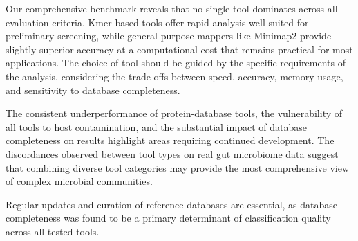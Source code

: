 \documentclass[11pt]{article}
\begin{document}
Our comprehensive benchmark reveals that no single tool dominates across all evaluation criteria. Kmer-based tools offer rapid analysis well-suited for preliminary screening, while general-purpose mappers like Minimap2 provide slightly superior accuracy at a computational cost that remains practical for most applications. The choice of tool should be guided by the specific requirements of the analysis, considering the trade-offs between speed, accuracy, memory usage, and sensitivity to database completeness.

The consistent underperformance of protein-database tools, the vulnerability of all tools to host contamination, and the substantial impact of database completeness on results highlight areas requiring continued development. The discordances observed between tool types on real gut microbiome data suggest that combining diverse tool categories may provide the most comprehensive view of complex microbial communities.

Regular updates and curation of reference databases are essential, as database completeness was found to be a primary determinant of classification quality across all tested tools.



\end{document}

